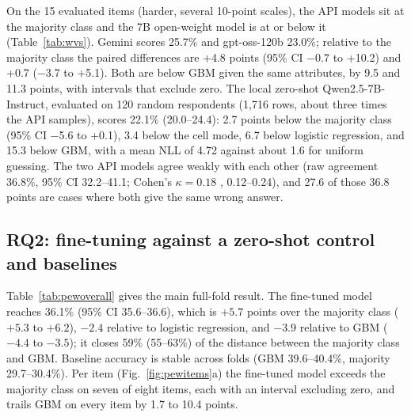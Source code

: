 \documentclass[conference]{IEEEtran}
\begin{document}
On the 15 evaluated items (harder, several 10-point scales), the API models sit at the majority class and the 7B open-weight model is at or below it (Table~\ref{tab:wvs}). Gemini scores 25.7\% and gpt-oss-120b 23.0\%; relative to the majority class the paired differences are +4.8 points (95\% CI $-$0.7 to +10.2) and +0.7 ($-$3.7 to +5.1). Both are below GBM given the same attributes, by 9.5 and 11.3 points, with intervals that exclude zero. The local zero-shot Qwen2.5-7B-Instruct, evaluated on 120 random respondents (1{,}716 rows, about three times the API samples), scores 22.1\% (20.0--24.4): 2.7 points below the majority class (95\% CI $-$5.6 to +0.1), 3.4 below the cell mode, 6.7 below logistic regression, and 15.3 below GBM, with a mean NLL of 4.72 against about 1.6 for uniform guessing. The two API models agree weakly with each other (raw agreement 36.8\%, 95\% CI 32.2--41.1; Cohen's $\kappa=0.18$ \cite{cohen1960}, 0.12--0.24), and 27.6 of those 36.8 points are cases where both give the same wrong answer.

\subsection{RQ2: fine-tuning against a zero-shot control and baselines}

\begin{table}[!t]
\caption{Pew fold-0 results on 46{,}209 held-out answers from 6{,}000 respondents. $^\dagger$MAE on ordinal items. $^\S$Mean absolute error of the predicted subgroup-mean answer on a $[0,1]$ scale (hard predictions; lower is better).}
\label{tab:pewoverall}
\centering
\footnotesize

\end{table}

\begin{table}[!t]
\caption{Pew zero-shot control: methods scored on identical rows (200 respondents, 1{,}548 rows). FT is the fine-tuned model (hard predictions from the lab run); NLL is available for probability-producing methods.}
\label{tab:pewzs}
\centering
\scriptsize

\end{table}

Table~\ref{tab:pewoverall} gives the main full-fold result. The fine-tuned model reaches 36.1\% (95\% CI 35.6--36.6), which is $+5.7$ points over the majority class ($+5.3$ to $+6.2$), $-2.4$ relative to logistic regression, and $-3.9$ relative to GBM ($-4.4$ to $-3.5$); it closes 59\% (55--63\%) of the distance between the majority class and GBM. Baseline accuracy is stable across folds (GBM 39.6--40.4\%, majority 29.7--30.4\%). Per item (Fig.~\ref{fig:pewitems}a) the fine-tuned model exceeds the majority class on seven of eight items, each with an interval excluding zero, and trails GBM on every item by 1.7 to 10.4 points.
\end{document}
